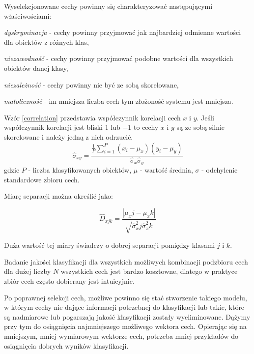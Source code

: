 Wyselekcjonowane cechy powinny się charakteryzować następującymi właściwościami\cite{STRUMIL}:

\begin{compactitem}
	\item \emph{dyskryminacja} - cechy powinny przyjmować jak najbardziej odmienne wartości dla obiektów z różnych klas,
	\item \emph{niezawodność} - cechy powinny przyjmować podobne wartości dla wszystkich obiektów danej klasy,
	\item \emph{niezależność} - cechy powinny nie być ze sobą skorelowane,
	\item \emph{małoliczność} - im mniejsza liczba cech tym złożoność systemu jest mniejsza.
\end{compactitem}

Wzór \ref{correlation} przedstawia współczynnik korelacji cech $x$ i $y$. Jeśli współczynnik korelacji jest bliski $1$ lub $-1$ to cechy $x$ i $y$ są ze sobą silnie skorelowane i należy jedną z nich odrzucić.
\begin{equation} 
\label{correlation} 
\hat{\sigma}_{xy}= \frac{\frac{1}{P}\sum\limits_{i=1}^P(x_i-\mu_x)(y_i-\mu_y)}{ \hat{\sigma}_x\hat{\sigma}_y }
\end{equation} gdzie $P$ - liczba klasyfikowanych obiektów, $\mu$ - wartość średnia, $\sigma$ - odchylenie standardowe zbioru cech.

Miarę separacji można określić jako:

\begin{equation}
	\hat{D}_{xjk} = \frac{|\mu_xj - \mu_xk|}{\sqrt{\hat{\sigma}^2_xj \hat{\sigma}^2_xk}}
\end{equation}

Duża wartość tej miary świadczy o dobrej separacji pomiędzy klasami $j$ i $k$.

Badanie jakości klasyfikacji dla wszystkich możliwych kombinacji podzbioru cech dla dużej liczby $N$ wszystkich cech jest bardzo kosztowne, dlatego w praktyce zbiór cech często dobierany jest intuicyjnie.\cite{STRUMIL}


Po poprawnej selekcji cech, możliwe powinno się stać stworzenie takiego modelu, w którym cechy nie dające informacji potrzebnej do klasyfikacji lub takie, które są nadmiarowe lub pogarszają jakość klasyfikacji zostały wyeliminowane. Dążymy przy tym do osiągnięcia najmniejszego możliwego wektora cech. Opierając się na mniejszym, mniej wymiarowym wektorze cech, potrzeba mniej przykładów do osiągnięcia dobrych wyników klasyfikacji.

